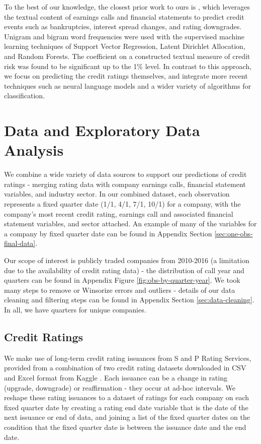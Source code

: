 \documentclass{article}[11pt]
\begin{document}
    To the best of our knowledge, the closest prior work to ours is \cite{donovan_measuring_2021}, which leverages the textual content of earnings calls and financial statements to predict credit events such as bankruptcies, interest spread changes, and rating downgrades. Unigram and bigram word frequencies were used with the supervised machine learning techniques of Support Vector Regression, Latent Dirichlet Allocation, and Random Forests. The coefficient on a constructed textual measure of credit risk was found to be significant up to the 1\% level. In contrast to this approach, we focus on predicting the credit ratings themselves, and integrate more recent techniques such as neural language models and a wider variety of algorithms for classification.

    \section*{Data and Exploratory Data Analysis}

    We combine a wide variety of data sources to support our predictions of credit ratings - merging rating data with company earnings calls, financial statement variables, and industry sector. In our combined dataset, each observation represents a fixed quarter date (1/1, 4/1, 7/1, 10/1) for a company, with the company's most recent credit rating, earnings call and associated financial statement variables, and sector attached. An example of many of the variables for a company by fixed quarter date can be found in Appendix Section \ref{sec:one-obs-final-data}.

    Our scope of interest is publicly traded companies from 2010-2016 (a limitation due to the availability of credit rating data) - the distribution of call year and quarters can be found in Appendix Figure \ref{fig:obs-by-quarter-year}. We took many steps to remove or Winsorize errors and outliers - details of our data cleaning and filtering steps can be found in Appendix Section \ref{sec:data-cleaning}. In all, we have \numQuarters \space quarters for \numCompanies \space unique companies.

    \subsection*{Credit Ratings}

    We make use of long-term credit rating issuances from S and P Rating Services, provided from a combination of two credit rating datasets downloaded in CSV and Excel format from Kaggle \citep{gewerc_corporate_2020,makwana_corporate_2022}. Each issuance can be a change in rating (upgrade, downgrade) or reaffirmation - they occur at ad-hoc intervals. We reshape these rating issuances to a dataset of ratings for each company on each fixed quarter date by creating a rating end date variable that is the date of the next issuance or end of data, and joining a list of the fixed quarter dates on the condition that the fixed quarter date is between the issuance date and the end date.
\end{document}
